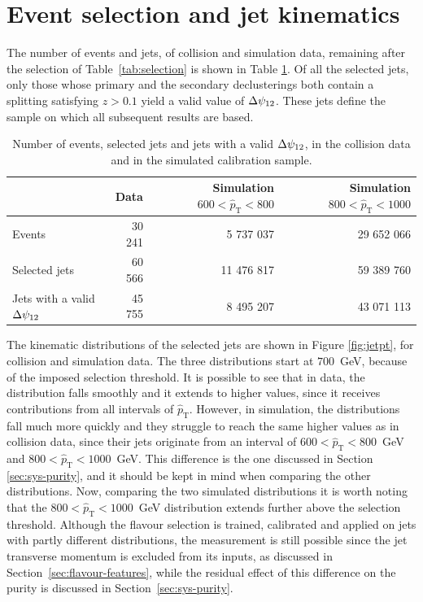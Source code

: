 \section{Event selection and jet kinematics}
\label{sec:res-kinematics}

The number of events and jets, of collision and simulation data, remaining after the selection of
Table~\ref{tab:selection} is shown in Table \ref{tab:jetcounts}. Of all the selected jets,
only those whose primary and the secondary declusterings both contain a splitting satisfying $z > 0.1$ yield a valid
value of $\Delta\psi_{12}$. These jets define the sample on which all subsequent results are
based.

\begin{table}[htbp]
    \centering
    \caption{Number of events, selected jets and jets with a valid $\Delta\psi_{12}$, in the
    collision data and in the simulated calibration sample.}
    \label{tab:jetcounts}
    \begin{tabular}{lrrr}
      \toprule
      & Data & Simulation $600 < \hat{p}_{\mathrm{T}} < 800$ & Simulation $800 < \hat{p}_{\mathrm{T}} < 1000$ \\
      \midrule
      Events                     & 30 241 & 5 737 037 & 29 652 066 \\
      Selected jets              & 60 566 & 11 476 817 & 59 389 760 \\
      Jets with a valid $\Delta\psi_{12}$  & 45 755 & 8 495 207 & 43 071 113 \\
      \bottomrule
    \end{tabular}
\end{table}

The kinematic distributions of the selected jets are shown in Figure \ref{fig:jetpt},
for collision and simulation data. The three distributions start at $700$~GeV, because
of the imposed selection threshold. It is possible to see that in data, the distribution
falls smoothly and it extends to higher values, since it receives contributions from all intervals of
$\hat{p}_{\mathrm{T}}$. However, in simulation, the distributions fall much more quickly and
they struggle to reach the same higher values as in collision data, since their jets
originate from an interval of $600 < \hat{p}_{\mathrm{T}} < 800$~GeV
and $800 < \hat{p}_{\mathrm{T}} < 1000$~GeV. 
This difference is the one discussed in
Section \ref{sec:sys-purity}, and it should be kept in mind when comparing the
other distributions. Now, comparing the two simulated distributions it is worth noting that 
the $800 < \hat{p}_{\mathrm{T}} < 1000$~GeV distribution extends further above the selection threshold.
Although the flavour selection is trained, calibrated and 
applied on jets with partly different distributions, the measurement is still possible since 
the jet transverse momentum is excluded from its inputs, as discussed in
Section~\ref{sec:flavour-features}, while
the residual effect of this difference on the purity is discussed in
Section~\ref{sec:sys-purity}.

